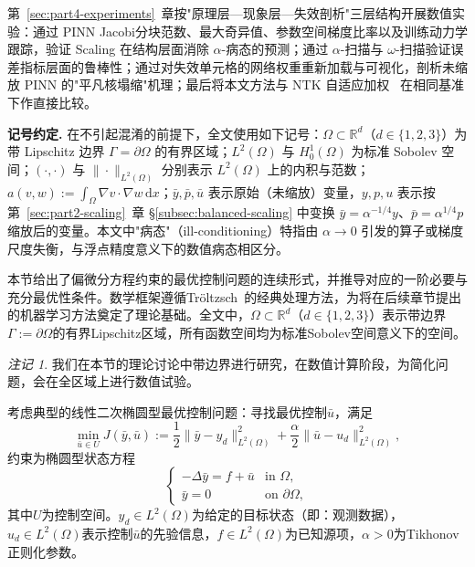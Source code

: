 \documentclass{xmu}
\theoremstyle{plain}
\theoremstyle{remark}
\newtheorem{remark}[theorem]{注记}
\begin{document}
第~\ref{sec:part4-experiments}~章按"原理层—现象层—失效剖析"三层结构开展数值实验：通过 PINN Jacobi分块范数、最大奇异值、参数空间梯度比率以及训练动力学跟踪，验证 Scaling 在结构层面消除 $\alpha$-病态的预测；通过 $\alpha$-扫描与 $\omega$-扫描验证误差指标层面的鲁棒性；通过对失效单元格的网络权重重新加载与可视化，剖析未缩放 PINN 的"平凡核塌缩"机理；最后将本文方法与 NTK 自适应加权~\cite{27} 在相同基准下作直接比较。

\bigskip

\noindent\textbf{记号约定.} 在不引起混淆的前提下，全文使用如下记号：$\Omega\subset\mathbb R^d$（$d\in\{1,2,3\}$）为带 Lipschitz 边界 $\Gamma=\partial\Omega$ 的有界区域；$L^2(\Omega)$ 与 $H_0^1(\Omega)$ 为标准 Sobolev 空间；$(\cdot,\cdot)$ 与 $\|\cdot\|_{L^2(\Omega)}$ 分别表示 $L^2(\Omega)$ 上的内积与范数；$a(v,w):=\int_\Omega\nabla v\cdot\nabla w\,\mathrm dx$；$\bar y, \bar p, \bar u$ 表示原始（未缩放）变量，$y, p, u$ 表示按第~\ref{sec:part2-scaling}~章 §\ref{subsec:balanced-scaling} 中变换 $\bar y = \alpha^{-1/4}y$、$\bar p = \alpha^{1/4}p$ 缩放后的变量。本文中"病态"（ill-conditioning）特指由 $\alpha\to 0$ 引发的算子或梯度尺度失衡，与浮点精度意义下的数值病态相区分。

\label{sec:part1-continuous}

本节给出了偏微分方程约束的最优控制问题的连续形式，并推导对应的一阶必要与充分最优性条件。数学框架遵循Tröltzsch~\cite{1}的经典处理方法，为将在后续章节提出的机器学习方法奠定了理论基础。全文中，$\Omega \subset \mathbb{R}^d$（$d \in \{1,2,3\}$）表示带边界$\Gamma := \partial\Omega$的有界Lipschitz区域，所有函数空间均为标准Sobolev空间意义下的空间。

\begin{remark}
    我们在本节的理论讨论中带边界进行研究，在数值计算阶段，为简化问题，会在全区域上进行数值试验。
\end{remark}

考虑典型的线性二次椭圆型最优控制问题：寻找最优控制$\bar{u}$，满足
\begin{equation}
\min_{\bar{u} \in U} J(\bar{y}, \bar{u}) := \frac{1}{2} \|\bar{y} - y_d\|^2_{L^2(\Omega)} + \frac{\alpha}{2} \|\bar{u} - u_d\|^2_{L^2(\Omega)},
\end{equation}
约束为椭圆型状态方程
\begin{equation}
\begin{cases}
-\Delta \bar{y} = f + \bar{u} & \text{in } \Omega, \\
\bar{y} = 0 & \text{on } \partial\Omega,
\end{cases}
\end{equation}
其中$U$为控制空间。$y_d \in L^2(\Omega)$为给定的目标状态（即：观测数据），$u_d \in L^2(\Omega)$表示控制$\bar{u}$的先验信息，$f \in L^2(\Omega)$为已知源项，$\alpha > 0$为Tikhonov正则化参数。
\end{document}
